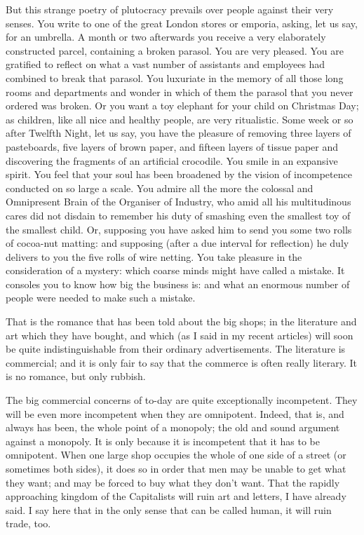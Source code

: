 \documentclass{book}
\begin{document}
But this strange poetry of plutocracy prevails over people against their very senses. You write to one of the great London stores or emporia, asking, let us say, for an umbrella. A month or two afterwards you receive a very elaborately constructed parcel, containing a broken parasol. You are very pleased. You are gratified to reflect on what a vast number of assistants and employees had combined to break that parasol. You luxuriate in the memory of all those long rooms and departments and wonder in which of them the parasol that you never ordered was broken. Or you want a toy elephant for your child on Christmas Day; as children, like all nice and healthy people, are very ritualistic. Some week or so after Twelfth Night, let us say, you have the pleasure of removing three layers of pasteboards, five layers of brown paper, and fifteen layers of tissue paper and discovering the fragments of an artificial crocodile. You smile in an expansive spirit. You feel that your soul has been broadened by the vision of incompetence conducted on so large a scale. You admire all the more the colossal and Omnipresent Brain of the Organiser of Industry, who amid all his multitudinous cares did not disdain to remember his duty of smashing even the smallest toy of the smallest child. Or, supposing you have asked him to send you some two rolls of cocoa-nut matting: and supposing (after a due interval for reflection) he duly delivers to you the five rolls of wire netting. You take pleasure in the consideration of a mystery: which coarse minds might have called a mistake. It consoles you to know how big the business is: and what an enormous number of people were needed to make such a mistake.

That is the romance that has been told about the big shops; in the literature and art which they have bought, and which (as I said in my recent articles) will soon be quite indistinguishable from their ordinary advertisements. The literature is commercial; and it is only fair to say that the commerce is often really literary. It is no romance, but only rubbish.

The big commercial concerns of to-day are quite exceptionally incompetent. They will be even more incompetent when they are omnipotent. Indeed, that is, and always has been, the whole point of a monopoly; the old and sound argument against a monopoly. It is only because it is incompetent that it has to be omnipotent. When one large shop occupies the whole of one side of a street (or sometimes both sides), it does so in order that men may be unable to get what they want; and may be forced to buy what they don’t want. That the rapidly approaching kingdom of the Capitalists will ruin art and letters, I have already said. I say here that in the only sense that can be called human, it will ruin trade, too.
\end{document}
